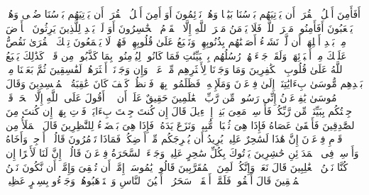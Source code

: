 \startbuffer[\q:7:97]
أَفَأَمِنَ أَهۡلُ ٱلۡقُرَىٰۤ أَن یَأۡتِیَهُم بَأۡسُنَا بَیَٰتࣰا وَهُمۡ نَاۤئِمُونَ%
\stopbuffer
\startbuffer[\q:7:98]
أَوَ أَمِنَ أَهۡلُ ٱلۡقُرَىٰۤ أَن یَأۡتِیَهُم بَأۡسُنَا ضُحࣰى وَهُمۡ یَلۡعَبُونَ%
\stopbuffer
\startbuffer[\q:7:99]
أَفَأَمِنُوا۟ مَكۡرَ ٱللَّهِۚ فَلَا یَأۡمَنُ مَكۡرَ ٱللَّهِ إِلَّا ٱلۡقَوۡمُ ٱلۡخَٰسِرُونَ%
\stopbuffer
\startbuffer[\q:7:100]
أَوَ لَمۡ یَهۡدِ لِلَّذِینَ یَرِثُونَ ٱلۡأَرۡضَ مِنۢ بَعۡدِ أَهۡلِهَاۤ أَن لَّوۡ نَشَاۤءُ أَصَبۡنَٰهُم بِذُنُوبِهِمۡۚ وَنَطۡبَعُ عَلَىٰ قُلُوبِهِمۡ فَهُمۡ لَا یَسۡمَعُونَ%
\stopbuffer
\startbuffer[\q:7:101]
تِلۡكَ ٱلۡقُرَىٰ نَقُصُّ عَلَیۡكَ مِنۡ أَنۢبَاۤئِهَاۚ وَلَقَدۡ جَاۤءَتۡهُمۡ رُسُلُهُم بِٱلۡبَیِّنَٰتِ فَمَا كَانُوا۟ لِیُؤۡمِنُوا۟ بِمَا كَذَّبُوا۟ مِن قَبۡلُۚ كَذَٰلِكَ یَطۡبَعُ ٱللَّهُ عَلَىٰ قُلُوبِ ٱلۡكَٰفِرِینَ%
\stopbuffer
\startbuffer[\q:7:102]
وَمَا وَجَدۡنَا لِأَكۡثَرِهِم مِّنۡ عَهۡدࣲۖ وَإِن وَجَدۡنَاۤ أَكۡثَرَهُمۡ لَفَٰسِقِینَ%
\stopbuffer
\startbuffer[\q:7:103]
ثُمَّ بَعَثۡنَا مِنۢ بَعۡدِهِم مُّوسَىٰ بِءَایَٰتِنَاۤ إِلَىٰ فِرۡعَوۡنَ وَمَلَإِی۟هِۦ فَظَلَمُوا۟ بِهَاۖ فَٱنظُرۡ كَیۡفَ كَانَ عَٰقِبَةُ ٱلۡمُفۡسِدِینَ%
\stopbuffer
\startbuffer[\q:7:104]
وَقَالَ مُوسَىٰ یَٰفِرۡعَوۡنُ إِنِّی رَسُولࣱ مِّن رَّبِّ ٱلۡعَٰلَمِینَ%
\stopbuffer
\startbuffer[\q:7:105]
حَقِیقٌ عَلَىٰۤ أَن لَّاۤ أَقُولَ عَلَى ٱللَّهِ إِلَّا ٱلۡحَقَّۚ قَدۡ جِئۡتُكُم بِبَیِّنَةࣲ مِّن رَّبِّكُمۡ فَأَرۡسِلۡ مَعِیَ بَنِیۤ إِسۡرَٰۤءِیلَ%
\stopbuffer
\startbuffer[\q:7:106]
قَالَ إِن كُنتَ جِئۡتَ بِءَایَةࣲ فَأۡتِ بِهَاۤ إِن كُنتَ مِنَ ٱلصَّٰدِقِینَ%
\stopbuffer
\startbuffer[\q:7:107]
فَأَلۡقَىٰ عَصَاهُ فَإِذَا هِیَ ثُعۡبَانࣱ مُّبِینࣱ%
\stopbuffer
\startbuffer[\q:7:108]
وَنَزَعَ یَدَهُۥ فَإِذَا هِیَ بَیۡضَاۤءُ لِلنَّٰظِرِینَ%
\stopbuffer
\startbuffer[\q:7:109]
قَالَ ٱلۡمَلَأُ مِن قَوۡمِ فِرۡعَوۡنَ إِنَّ هَٰذَا لَسَٰحِرٌ عَلِیمࣱ%
\stopbuffer
\startbuffer[\q:7:110]
یُرِیدُ أَن یُخۡرِجَكُم مِّنۡ أَرۡضِكُمۡۖ فَمَاذَا تَأۡمُرُونَ%
\stopbuffer
\startbuffer[\q:7:111]
قَالُوۤا۟ أَرۡجِهۡ وَأَخَاهُ وَأَرۡسِلۡ فِی ٱلۡمَدَاۤئِنِ حَٰشِرِینَ%
\stopbuffer
\startbuffer[\q:7:112]
یَأۡتُوكَ بِكُلِّ سَٰحِرٍ عَلِیمࣲ%
\stopbuffer
\startbuffer[\q:7:113]
وَجَاۤءَ ٱلسَّحَرَةُ فِرۡعَوۡنَ قَالُوۤا۟ إِنَّ لَنَا لَأَجۡرًا إِن كُنَّا نَحۡنُ ٱلۡغَٰلِبِینَ%
\stopbuffer
\startbuffer[\q:7:114]
قَالَ نَعَمۡ وَإِنَّكُمۡ لَمِنَ ٱلۡمُقَرَّبِینَ%
\stopbuffer
\startbuffer[\q:7:115]
قَالُوا۟ یَٰمُوسَىٰۤ إِمَّاۤ أَن تُلۡقِیَ وَإِمَّاۤ أَن نَّكُونَ نَحۡنُ ٱلۡمُلۡقِینَ%
\stopbuffer
\startbuffer[\q:7:116]
قَالَ أَلۡقُوا۟ۖ فَلَمَّاۤ أَلۡقَوۡا۟ سَحَرُوۤا۟ أَعۡیُنَ ٱلنَّاسِ وَٱسۡتَرۡهَبُوهُمۡ وَجَاۤءُو بِسِحۡرٍ عَظِیمࣲ%
\stopbuffer
\startbuffer[\q:7:117]
